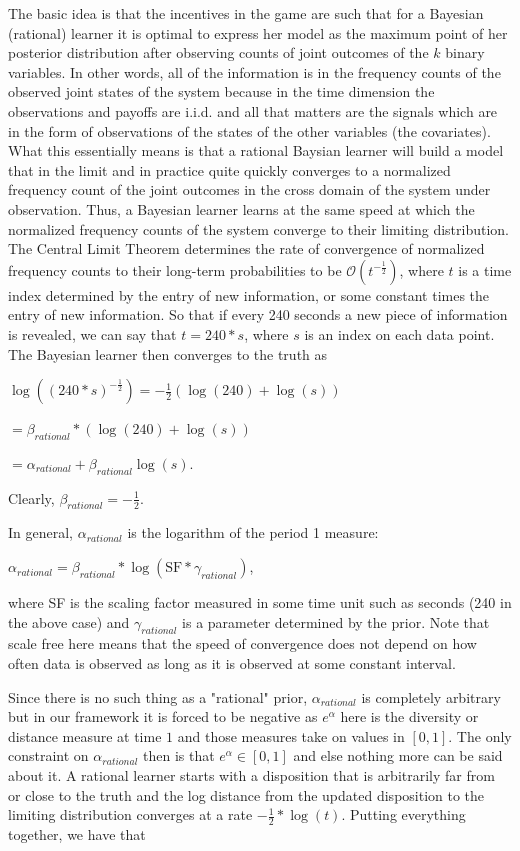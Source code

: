 \documentclass{article}
\begin{document}
The basic idea is that the incentives in the game are such that for a Bayesian (rational) learner it is optimal to express her model as the maximum point of her posterior distribution after observing counts of joint outcomes of the $k$ binary variables. In other words, all of the information is in the frequency counts of the observed joint states of the system because in the time dimension the observations and payoffs are i.i.d. and all that matters are the signals which are in the form of observations of the states of the other variables (the covariates). 
What this essentially means is that a rational Baysian learner will build a model that in the limit and in practice quite quickly converges to a normalized frequency count of the joint outcomes in the cross domain of the system under observation. Thus, a Bayesian learner learns at the same speed at which the normalized frequency counts of the system converge to their limiting distribution. The Central Limit Theorem determines the rate of convergence of normalized frequency counts to their long-term probabilities to be $\mathcal{O}( t^{-\frac{1}{2}})$, where $t$ is a time index determined by the entry of new information, or some constant times the entry of new information. So that if every 240 seconds a new piece of information is revealed, we can say that $t=240*s$, where $s$ is an index on each data point. The Bayesian learner then converges to the truth as 

$\log((240*s)^{-\frac{1}{2}}) =-\frac{1}{2}(\log(240) + \log(s))$

$= \beta_{rational} * (\log(240)+\log(s))$

$= \alpha_{rational}+\beta_{rational}\log(s).$  

Clearly, $\beta_{rational}=-\frac{1}{2}.$ 

In general, $\alpha_{rational}$ is the logarithm of the period 1 measure:

$\alpha_{rational}=\beta_{rational} * \log(\text{SF}*\gamma_{rational})$,

where SF is the scaling factor measured in some time unit such as seconds (240 in the above case) and $\gamma_{rational}$ is a parameter determined by the prior.  Note that scale free here means that the speed of convergence does not depend on how often data is observed as long as it is observed at some constant interval. 

Since there is no such thing as a "rational" prior, $\alpha_{rational}$ is completely arbitrary but in our framework it is forced to be negative as $e^{\alpha}$ here is the diversity or distance measure at time $1$ and those measures take on values in $[0, 1]$. The only constraint on $\alpha_{rational}$ then is that $e^{\alpha}\in [0, 1]$ and else nothing more can be said about it. A rational learner starts with a disposition that is arbitrarily far from or close to the truth and the log distance from the updated disposition to the limiting distribution converges at a rate $-\frac{1}{2}*\log(t)$.  Putting everything together, we have that 
\end{document}

